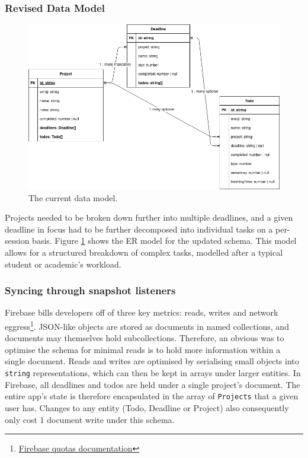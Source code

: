 \subsubsection{Revised Data Model}
\begin{figure}[h]
    \begin{center}
        \includegraphics[scale=0.5]{images/final_data_model.png}
    \end{center}
    \caption{The current data model.}
    \label{fig:app_current_data_model}
\end{figure}

Projects needed to be broken down further into multiple deadlines, and a given deadline in focus had to be further decomposed into individual tasks on a per-session basis. Figure \ref{fig:app_current_data_model} shows the ER model for the updated schema. This model allows for a structured breakdown of complex tasks, modelled after a typical student or academic's workload.

\subsubsection{Syncing through snapshot listeners}
Firebase bills developers off of three key metrics: reads, writes and network eggress\footnote{\href{https://cloud.google.com/firestore/quotas}{Firebase quotas documentation}}. JSON-like objects are stored as documents in named collections, and documents may themselves hold subcollections. Therefore, an obvious was to optimise the schema for minimal reads is to hold more information within a single document. Reads and writes are optimised by serialising small objects into \texttt{string} representations, which can then be kept in arrays under larger entities. In Firebase, all deadlines and todos are held under a single project's document. The entire app's state is therefore encapsulated in the array of \texttt{Projects} that a given user has. Changes to any entity (Todo, Deadline or Project) also consequently only cost 1 document write under this schema.

